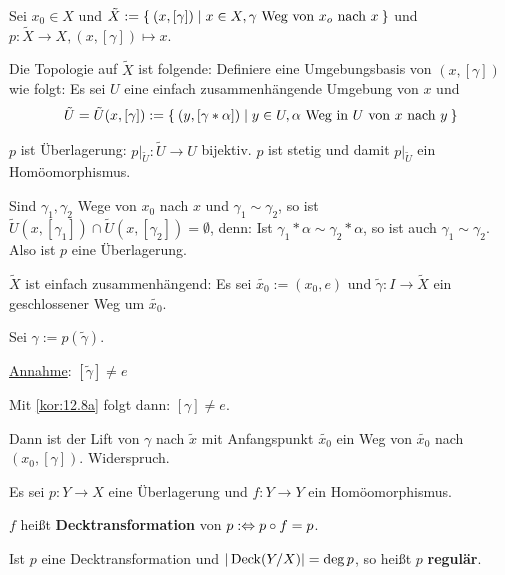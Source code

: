 \begin{beweis}
    Sei $x_0 \in X$ und $\tilde{X} := \Set{(x, [\gamma]) | x \in X, \gamma \text{ Weg von } x_o \text{ nach } x}$
    und $p: \tilde{X} \rightarrow X, (x, [\gamma]) \mapsto x$.

    Die Topologie auf $\tilde{X}$ ist folgende:
    Definiere eine Umgebungsbasis von $(x, [\gamma])$ wie folgt:
    Es sei $U$ eine einfach zusammenhängende Umgebung von $x$ und
    \[\tilde{U} = \tilde{U}(x, [\gamma]) := \Set{(y, [\gamma * \alpha]) | y \in U, \alpha \text{ Weg in } U \text{ von } x \text{ nach } y} \]

    $p$ ist Überlagerung: $p|_{\tilde{U}} : \tilde{U} \rightarrow U$
    bijektiv. $p$ ist stetig und damit $p|_{\tilde{U}}$ ein 
    Homöomorphismus.

    Sind $\gamma_1, \gamma_2$ Wege von $x_0$ nach $x$ und $\gamma_1 \sim \gamma_2$,
    so ist $\tilde{U}(x, [\gamma_1]) \cap \tilde{U}(x, [\gamma_2]) = \emptyset$,
    denn: Ist $\gamma_1 * \alpha \sim \gamma_2 * \alpha$, so ist auch
    $\gamma_1 \sim \gamma_2$. Also ist $p$ eine Überlagerung.

    $\tilde{X}$ ist einfach zusammenhängend: Es sei $\tilde{x_0} := (x_0, e)$
    und $\tilde{\gamma}: I \rightarrow \tilde{X}$ ein geschlossener
    Weg um $\tilde{x_0}$.

    Sei $\gamma := p(\tilde{\gamma})$.

    \underline{Annahme}: $[\tilde{\gamma}] \neq e$

    Mit \cref{kor:12.8a} folgt dann: $[\gamma] \neq e$.

    Dann ist der Lift von $\gamma$ nach $\tilde{x}$ mit Anfangspunkt
    $\tilde{x_0}$ ein Weg von $\tilde{x_0}$ nach $(x_0, [\gamma])$.
    Widerspruch.
\end{beweis}

\begin{definition}%
    Es sei $p:Y \rightarrow X$ eine Überlagerung und $f:Y \rightarrow Y$
    ein Homöomorphismus.

    $f$ heißt \textbf{Decktransformation} von $p :\Leftrightarrow p \circ f = p$.

    Ist $p$ eine Decktransformation und $|\operatorname{Deck}(Y/X)| = \deg{p}$,
    so heißt $p$ \textbf{regulär}.
\end{definition}

